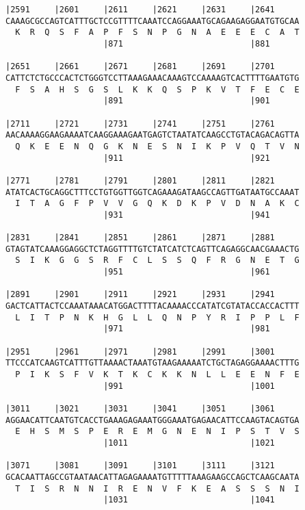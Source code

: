 \documentclass{article}
\begin{document}
\newpage
\begin{Verbatim}[fontfamily=courier]
|2591     |2601     |2611     |2621     |2631     |2641     
CAAAGCGCCAGTCATTTGCTCCGTTTTCAAATCCAGGAAATGCAGAAGAGGAATGTGCAA
  K  R  Q  S  F  A  P  F  S  N  P  G  N  A  E  E  E  C  A  T
                    |871                          |881      

|2651     |2661     |2671     |2681     |2691     |2701     
CATTCTCTGCCCACTCTGGGTCCTTAAAGAAACAAAGTCCAAAAGTCACTTTTGAATGTG
  F  S  A  H  S  G  S  L  K  K  Q  S  P  K  V  T  F  E  C  E
                    |891                          |901      

|2711     |2721     |2731     |2741     |2751     |2761     
AACAAAAGGAAGAAAATCAAGGAAAGAATGAGTCTAATATCAAGCCTGTACAGACAGTTA
  Q  K  E  E  N  Q  G  K  N  E  S  N  I  K  P  V  Q  T  V  N
                    |911                          |921      

|2771     |2781     |2791     |2801     |2811     |2821     
ATATCACTGCAGGCTTTCCTGTGGTTGGTCAGAAAGATAAGCCAGTTGATAATGCCAAAT
  I  T  A  G  F  P  V  V  G  Q  K  D  K  P  V  D  N  A  K  C
                    |931                          |941      

|2831     |2841     |2851     |2861     |2871     |2881     
GTAGTATCAAAGGAGGCTCTAGGTTTTGTCTATCATCTCAGTTCAGAGGCAACGAAACTG
  S  I  K  G  G  S  R  F  C  L  S  S  Q  F  R  G  N  E  T  G
                    |951                          |961      

|2891     |2901     |2911     |2921     |2931     |2941     
GACTCATTACTCCAAATAAACATGGACTTTTACAAAACCCATATCGTATACCACCACTTT
  L  I  T  P  N  K  H  G  L  L  Q  N  P  Y  R  I  P  P  L  F
                    |971                          |981      

|2951     |2961     |2971     |2981     |2991     |3001     
TTCCCATCAAGTCATTTGTTAAAACTAAATGTAAGAAAAATCTGCTAGAGGAAAACTTTG
  P  I  K  S  F  V  K  T  K  C  K  K  N  L  L  E  E  N  F  E
                    |991                          |1001     

|3011     |3021     |3031     |3041     |3051     |3061     
AGGAACATTCAATGTCACCTGAAAGAGAAATGGGAAATGAGAACATTCCAAGTACAGTGA
  E  H  S  M  S  P  E  R  E  M  G  N  E  N  I  P  S  T  V  S
                    |1011                         |1021     

|3071     |3081     |3091     |3101     |3111     |3121     
GCACAATTAGCCGTAATAACATTAGAGAAAATGTTTTTAAAGAAGCCAGCTCAAGCAATA
  T  I  S  R  N  N  I  R  E  N  V  F  K  E  A  S  S  S  N  I
                    |1031                         |1041     

\end{Verbatim}
\end{document}
